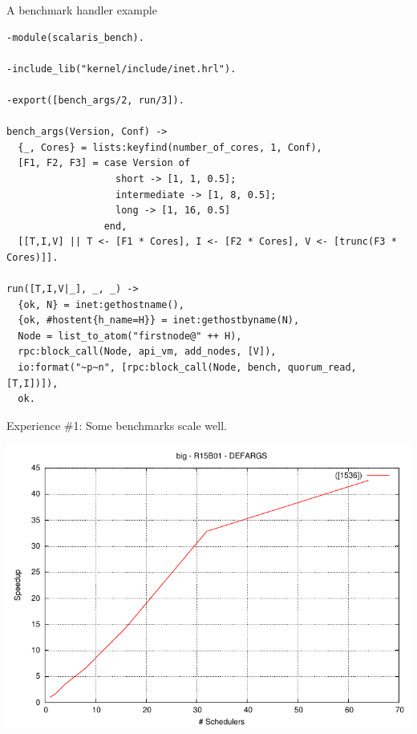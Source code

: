 \documentclass{beamer}
\begin{document}
\begin{frame}[fragile]{A benchmark handler example}

	\scriptsize
    \begin{verbatim}
-module(scalaris_bench).

-include_lib("kernel/include/inet.hrl").

-export([bench_args/2, run/3]).

bench_args(Version, Conf) ->
  {_, Cores} = lists:keyfind(number_of_cores, 1, Conf),
  [F1, F2, F3] = case Version of
                   short -> [1, 1, 0.5];
                   intermediate -> [1, 8, 0.5];
                   long -> [1, 16, 0.5]
                 end,
  [[T,I,V] || T <- [F1 * Cores], I <- [F2 * Cores], V <- [trunc(F3 * Cores)]].

run([T,I,V|_], _, _) ->
  {ok, N} = inet:gethostname(),
  {ok, #hostent{h_name=H}} = inet:gethostbyname(N),
  Node = list_to_atom("firstnode@" ++ H),
  rpc:block_call(Node, api_vm, add_nodes, [V]),
  io:format("~p~n", [rpc:block_call(Node, bench, quorum_read, [T,I])]),
  ok.
	\end{verbatim}
	\normalsize
\end{frame}

\begin{frame}{Experience \#1: Some benchmarks scale well.}
	\begin{center}
		\includegraphics[width=0.8\linewidth]{figures/big-speedup-bulldozer.pdf}
	\end{center}
\end{frame}
\end{document}
